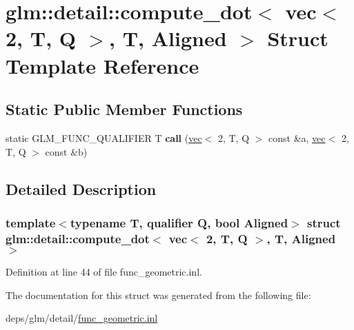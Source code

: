 \hypertarget{structglm_1_1detail_1_1compute__dot_3_01vec_3_012_00_01T_00_01Q_01_4_00_01T_00_01Aligned_01_4}{}\section{glm\+:\+:detail\+:\+:compute\+\_\+dot$<$ vec$<$ 2, T, Q $>$, T, Aligned $>$ Struct Template Reference}
\label{structglm_1_1detail_1_1compute__dot_3_01vec_3_012_00_01T_00_01Q_01_4_00_01T_00_01Aligned_01_4}
\subsection*{Static Public Member Functions}
\begin{DoxyCompactItemize}
\item 
\mbox{\label{structglm_1_1detail_1_1compute__dot_3_01vec_3_012_00_01T_00_01Q_01_4_00_01T_00_01Aligned_01_4_a8ed20e236d03a8f963b61e6e7b7a219f}} 
static G\+L\+M\+\_\+\+F\+U\+N\+C\+\_\+\+Q\+U\+A\+L\+I\+F\+I\+ER T {\bfseries call} (\hyperlink{structglm_1_1vec}{vec}$<$ 2, T, Q $>$ const \&a, \hyperlink{structglm_1_1vec}{vec}$<$ 2, T, Q $>$ const \&b)
\end{DoxyCompactItemize}


\subsection{Detailed Description}
\subsubsection*{template$<$typename T, qualifier Q, bool Aligned$>$\newline
struct glm\+::detail\+::compute\+\_\+dot$<$ vec$<$ 2, T, Q $>$, T, Aligned $>$}



Definition at line 44 of file func\+\_\+geometric.\+inl.



The documentation for this struct was generated from the following file\+:\begin{DoxyCompactItemize}
\item 
deps/glm/detail/\hyperlink{func__geometric_8inl}{func\+\_\+geometric.\+inl}\end{DoxyCompactItemize}
